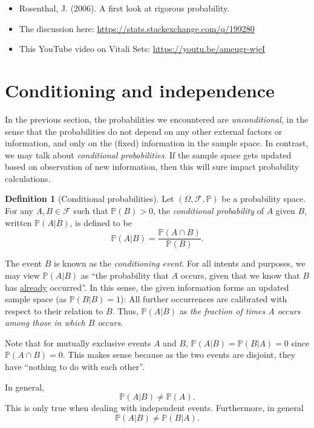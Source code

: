 \documentclass[
]{book}
\providecommand{\tightlist}{%
  \setlength{\itemsep}{0pt}\setlength{\parskip}{0pt}}
\newcommand{\bbP}{\mathbb{P}}
\newcommand{\cF}{{\mathcal F}}
\theoremstyle{definition}
\newtheorem{definition}{Definition}[chapter]
\theoremstyle{definition}
\theoremstyle{definition}
\theoremstyle{definition}
\theoremstyle{remark}
\begin{document}
\begin{itemize}
\tightlist
\item
  Rosenthal, J. (2006). A first look at rigorous probability.
\item
  The discussion here: \url{https://stats.stackexchange.com/q/199280}
\item
  This YouTube video on Vitali Sets: \url{https://youtu.be/ameugr-wjeI}
\end{itemize}

\hypertarget{conditioning-and-independence}{%
\section{Conditioning and independence}\label{conditioning-and-independence}}

In the previous section, the probabilities we encountered are \emph{unconditional}, in the sense that the probabilities do not depend on any other external factors or information, and only on the (fixed) information in the sample space.
In contrast, we may talk about \emph{conditional probabilities}.
If the sample space gets updated based on observation of new information, then this will sure impact probability calculations.

\begin{definition}[Conditional probabilities]
\protect\hypertarget{def:condprob}{}\label{def:condprob}Let \((\Omega,\cF,\bbP)\) be a probability space. For any \(A,B \in\cF\) such that \(\bbP(B)>0\), the \emph{conditional probability} of \(A\) given \(B\), written \(\bbP(A | B)\), is defined to be
\[
  \bbP(A | B) = \frac{\bbP(A \cap B)}{\bbP(B)}.
\]
\end{definition}

The event \(B\) is known as the \emph{conditioning event}.
For all intents and purposes, we may view \(\bbP(A | B)\) as ``the probability that \(A\) occurs, given that we know that \(B\) has \uline{already} occurred''.
In this sense, the given information forms an updated sample space (as \(\bbP(B | B) = 1\)):
All further occurrences are calibrated with respect to their relation to \(B\).
Thus, \(\bbP(A | B)\) as \emph{the fraction of times \(A\) occurs among those in which \(B\) occurs}.

Note that for mutually exclusive events \(A\) and \(B\), \(\bbP(A | B)=\bbP(B | A)=0\) since \(\bbP(A \cap B) = 0\).
This makes sense because as the two events are disjoint, they have ``nothing to do with each other''.

In general, \[\bbP(A | B) \neq \bbP(A).\] This is only true when dealing with independent events. Furthermore, in general \[\bbP(A | B) \neq \bbP(B | A).\]
\end{document}
